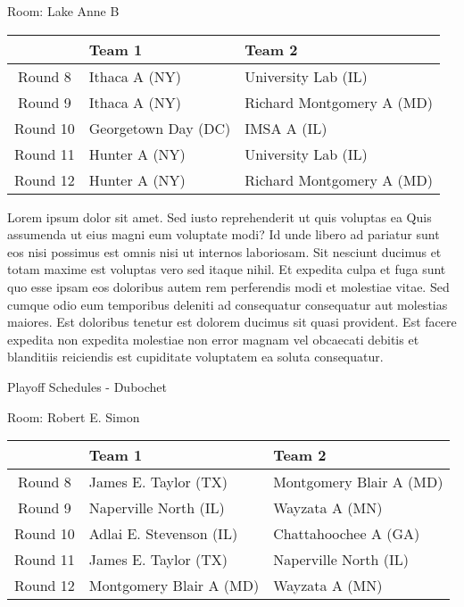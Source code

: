 \documentclass{article}%
\begin{document}
\begin{flushleft}%
\begin{Large}%
Room: Lake Anne B%
\end{Large}%
\end{flushleft}%
\begin{tabularx}{\textwidth}{|c|Y|Y|}%
\hline%
&Team 1&Team 2\\%
\hline%
Round 8&Ithaca A (NY)&University Lab (IL)\\%
Round 9&Ithaca A (NY)&Richard Montgomery A (MD)\\%
Round 10&Georgetown Day (DC)&IMSA A (IL)\\%
Round 11&Hunter A (NY)&University Lab (IL)\\%
Round 12&Hunter A (NY)&Richard Montgomery A (MD)\\%
\hline%
\end{tabularx}%
\vspace*{8pt}%
\linebreak%
\newline%
Lorem ipsum dolor sit amet. Sed iusto reprehenderit ut quis voluptas ea Quis assumenda ut eius magni eum voluptate modi? Id unde libero ad pariatur sunt eos nisi possimus est omnis nisi ut internos laboriosam. Sit nesciunt ducimus et totam maxime est voluptas vero sed itaque nihil. Et expedita culpa et fuga sunt quo esse ipsam eos doloribus autem rem perferendis modi et molestiae vitae.\newline%
\newline%
Sed cumque odio eum temporibus deleniti ad consequatur consequatur aut molestias maiores. Est doloribus tenetur est dolorem ducimus sit quasi provident. Est facere expedita non expedita molestiae non error magnam vel obcaecati debitis et blanditiis reiciendis est cupiditate voluptatem ea soluta consequatur.%
\newpage%
\begin{center}%
\begin{Huge}%
Playoff Schedules {-} Dubochet%
\end{Huge}%
\end{center}%
\begin{flushleft}%
\begin{Large}%
Room: Robert E. Simon%
\end{Large}%
\end{flushleft}%
\begin{tabularx}{\textwidth}{|c|Y|Y|}%
\hline%
&Team 1&Team 2\\%
\hline%
Round 8&James E. Taylor (TX)&Montgomery Blair A (MD)\\%
Round 9&Naperville North (IL)&Wayzata A (MN)\\%
Round 10&Adlai E. Stevenson (IL)&Chattahoochee A (GA)\\%
Round 11&James E. Taylor (TX)&Naperville North (IL)\\%
Round 12&Montgomery Blair A (MD)&Wayzata A (MN)\\%
\hline%
\end{tabularx}%
\end{document}
